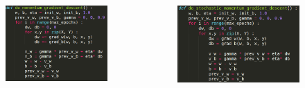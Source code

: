 \begin{frame}
	\begin{columns}
		\begin{overlayarea}{\textwidth}{\textheight}
			\begin{figure}
				\includegraphics[scale=0.3]{images/module6/pseudo_code_mom_crop.png}
			\end{figure}
		\end{overlayarea}
		
		\begin{overlayarea}{\textwidth}{\textheight}
			\begin{figure}
				\includegraphics[scale=0.3]{images/module6/pseudo_code_stoch_mom_crop.png}
			\end{figure}
		\end{overlayarea}
	\end{columns}
\end{frame}


